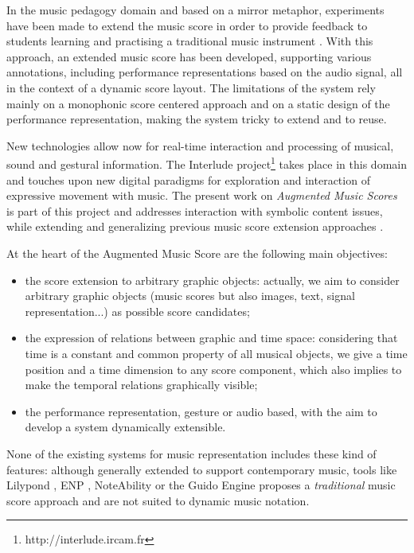 \documentclass{article}
\begin{document}
In the music pedagogy domain and based on a mirror metaphor, experiments have been made to extend the music score in order to provide feedback to students learning and practising a traditional music instrument \cite{Fober:04c,Fober:07b}. With this approach, an extended music score has been developed, supporting various annotations, including performance representations based on the audio signal, all in the context of a dynamic score layout. The limitations of the system rely mainly on a monophonic score centered approach and on a static design of the performance representation, making the system tricky to extend and to reuse.

New technologies allow now for real-time interaction and processing of musical, sound and gestural information. The Interlude project\footnote{http://interlude.ircam.fr} takes place in this domain and touches upon new digital paradigms for exploration and interaction of expressive movement with music. The present work on \emph{Augmented Music Scores} is part of this project and addresses interaction with symbolic content issues, while extending and generalizing previous music score extension approaches \cite{Fober:07b}. 

At the heart of the Augmented Music Score are the following main objectives:
\begin{itemize}
\item the score extension to arbitrary graphic objects: actually, we aim to consider arbitrary graphic objects (music scores but also images, text, signal representation...) as possible score candidates;

\item the expression of relations between graphic and time space: considering that time is a constant and common property of all musical objects, we give a time position and a time dimension to any score component, which also implies to make the temporal relations graphically visible;

\item the performance representation, gesture or audio based, with the aim to develop a system dynamically extensible.
\end{itemize}

None of the existing systems for music representation includes these kind of features: although generally extended to support contemporary music, tools like Lilypond \cite{lilypond03}, ENP \cite{KUUSK06}, NoteAbility \cite{Hamel98} or the Guido Engine \cite{Fober:04b} proposes a \emph{traditional} music score approach and are not suited to dynamic music notation.
\end{document}
